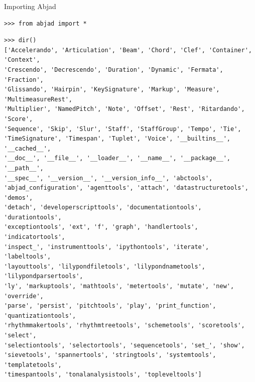 \documentclass[10pt]{beamer}
\newenvironment{abjadbookoutput}{}{}
\begin{document}
\begin{frame}[fragile]{Importing Abjad}

\begin{abjadbookoutput}
\begin{singlespacing}
\vspace{-0.5\baselineskip}
\begin{verbatim}
>>> from abjad import *
\end{verbatim}
\end{singlespacing}
\end{abjadbookoutput}

\begin{abjadbookoutput}
\begin{singlespacing}
\vspace{-0.5\baselineskip}
\begin{verbatim}
>>> dir()
['Accelerando', 'Articulation', 'Beam', 'Chord', 'Clef', 'Container', 'Context',
'Crescendo', 'Decrescendo', 'Duration', 'Dynamic', 'Fermata', 'Fraction',
'Glissando', 'Hairpin', 'KeySignature', 'Markup', 'Measure', 'MultimeasureRest',
'Multiplier', 'NamedPitch', 'Note', 'Offset', 'Rest', 'Ritardando', 'Score',
'Sequence', 'Skip', 'Slur', 'Staff', 'StaffGroup', 'Tempo', 'Tie',
'TimeSignature', 'Timespan', 'Tuplet', 'Voice', '__builtins__', '__cached__',
'__doc__', '__file__', '__loader__', '__name__', '__package__', '__path__',
'__spec__', '__version__', '__version_info__', 'abctools',
'abjad_configuration', 'agenttools', 'attach', 'datastructuretools', 'demos',
'detach', 'developerscripttools', 'documentationtools', 'durationtools',
'exceptiontools', 'ext', 'f', 'graph', 'handlertools', 'indicatortools',
'inspect_', 'instrumenttools', 'ipythontools', 'iterate', 'labeltools',
'layouttools', 'lilypondfiletools', 'lilypondnametools', 'lilypondparsertools',
'ly', 'markuptools', 'mathtools', 'metertools', 'mutate', 'new', 'override',
'parse', 'persist', 'pitchtools', 'play', 'print_function', 'quantizationtools',
'rhythmmakertools', 'rhythmtreetools', 'schemetools', 'scoretools', 'select',
'selectiontools', 'selectortools', 'sequencetools', 'set_', 'show',
'sievetools', 'spannertools', 'stringtools', 'systemtools', 'templatetools',
'timespantools', 'tonalanalysistools', 'topleveltools']
\end{verbatim}
\end{singlespacing}
\end{abjadbookoutput}

\end{frame}
\end{document}
